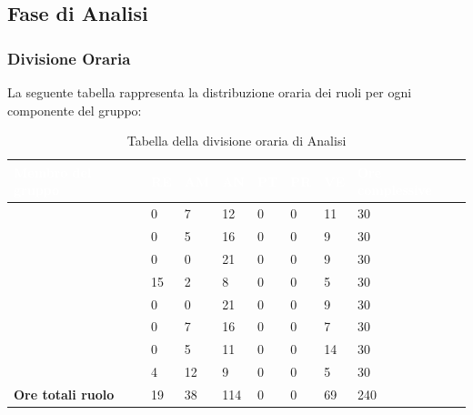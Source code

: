 \subsection{Fase di Analisi}

\subsubsection{Divisione Oraria}
La seguente tabella rappresenta la distribuzione oraria dei ruoli per ogni componente del gruppo:
{
\renewcommand{\arraystretch}{2}
\begin{longtable}[h!] { C{4cm} C{1cm} C{1cm} C{1cm} C{1cm} C{1cm} C{1cm} C{3cm}}
\caption{Tabella della divisione oraria di Analisi}	\\

\textcolor{white}{\textbf{Membro del gruppo}} & 
\textcolor{white}{\textbf{RE}} & 
\textcolor{white}{\textbf{AM}} & 
\textcolor{white}{\textbf{AN}} & 
\textcolor{white}{\textbf{PT}} & 
\textcolor{white}{\textbf{PR}} & 
\textcolor{white}{\textbf{VE}} & 
\textcolor{white}{\textbf{Ore complessive}}\\	
\endhead

\MC{}                     &  0 &  7 &  12 & 0 & 0 & 11 &  30 \\
\LD{}                     &  0 &  5 &  16 & 0 & 0 &  9 &  30 \\
\CE{}                     &  0 &  0 &  21 & 0 & 0 &  9 &  30 \\
\SE{}                     & 15 &  2 &   8 & 0 & 0 &  5 &  30 \\
\PF{}                     &  0 &  0 &  21 & 0 & 0 &  9 &  30 \\
\DF{}                     &  0 &  7 &  16 & 0 & 0 &  7 &  30 \\
\BR{}                     &  0 &  5 &  11 & 0 & 0 & 14 &  30 \\
\AT{}                     &  4 & 12 &   9 & 0 & 0 &  5 &  30 \\
\textbf{Ore totali ruolo} & 19 & 38 & 114 & 0 & 0 & 69 & 240 \\

\end{longtable}
}

